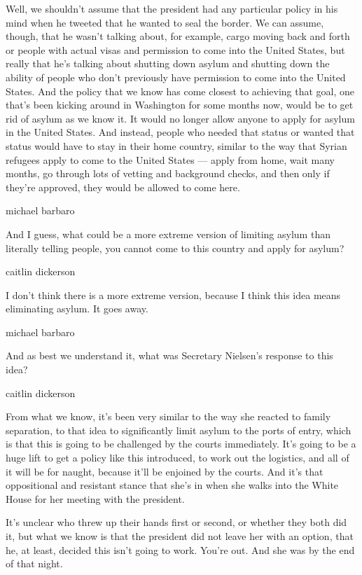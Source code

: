 Well, we shouldn't assume that the president had any particular policy
in his mind when he tweeted that he wanted to seal the border. We can
assume, though, that he wasn't talking about, for example, cargo moving
back and forth or people with actual visas and permission to come into
the United States, but really that he's talking about shutting down
asylum and shutting down the ability of people who don't previously have
permission to come into the United States. And the policy that we know
has come closest to achieving that goal, one that's been kicking around
in Washington for some months now, would be to get rid of asylum as we
know it. It would no longer allow anyone to apply for asylum in the
United States. And instead, people who needed that status or wanted that
status would have to stay in their home country, similar to the way that
Syrian refugees apply to come to the United States --- apply from home,
wait many months, go through lots of vetting and background checks, and
then only if they're approved, they would be allowed to come here.

michael barbaro

And I guess, what could be a more extreme version of limiting asylum
than literally telling people, you cannot come to this country and apply
for asylum?

caitlin dickerson

I don't think there is a more extreme version, because I think this idea
means eliminating asylum. It goes away.

michael barbaro

And as best we understand it, what was Secretary Nielsen's response to
this idea?

caitlin dickerson

From what we know, it's been very similar to the way she reacted to
family separation, to that idea to significantly limit asylum to the
ports of entry, which is that this is going to be challenged by the
courts immediately. It's going to be a huge lift to get a policy like
this introduced, to work out the logistics, and all of it will be for
naught, because it'll be enjoined by the courts. And it's that
oppositional and resistant stance that she's in when she walks into the
White House for her meeting with the president.

It's unclear who threw up their hands first or second, or whether they
both did it, but what we know is that the president did not leave her
with an option, that he, at least, decided this isn't going to work.
You're out. And she was by the end of that night.

